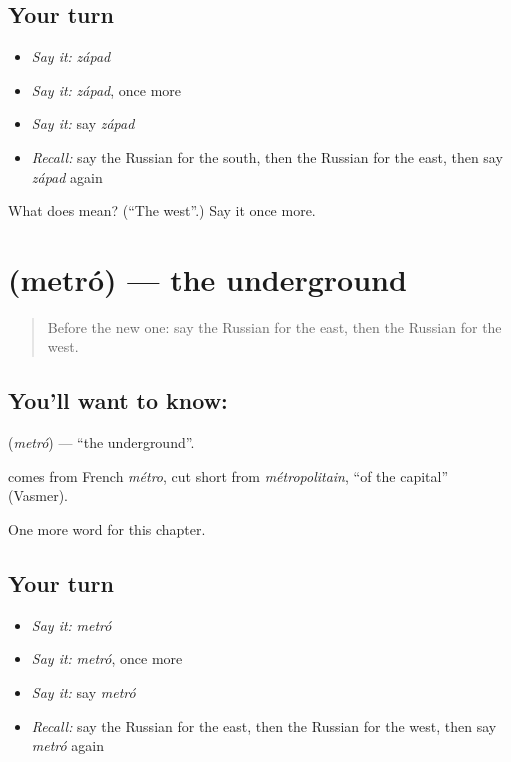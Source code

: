 \subsection*{Your turn}
\begin{itemize}
\raggedright
  \item \emph{Say it:} \emph{západ}
  \item \emph{Say it:} \emph{západ}, once more
  \item \emph{Say it:} say \emph{západ}
  \item \emph{Recall:} say the Russian for the south, then the Russian for the east, then say \emph{západ} again
\end{itemize}

\begin{tcolorbox}[breakable,colback=teal!4,colframe=teal!35!black,title={Before you move on}]
What does  mean? (\textquotedblleft{}The west\textquotedblright{}.) Say it once more.
\end{tcolorbox}
\section[\texorpdfstring{\ru{метро} (metró)}{метро (metró)}]{ (metró) — the underground}

\label{lesson:RU-C91-underground}



\begin{quote}
Before the new one: say the Russian for the east, then the Russian for the west.
\end{quote}

\subsection*{You'll want to know: }
\textbf{} (\emph{metró}) — \textquotedblleft{}the underground\textquotedblright{}.

\begin{cousinweb}
\textbf{} comes from French \emph{métro}, cut short from \emph{métropolitain}, \textquotedblleft{}of the capital\textquotedblright{} (Vasmer).
\end{cousinweb}

\begin{grammarlens}[title={What you've built}]
One more word for this chapter.
\end{grammarlens}

\subsection*{Your turn}
\begin{itemize}
\raggedright
  \item \emph{Say it:} \emph{metró}
  \item \emph{Say it:} \emph{metró}, once more
  \item \emph{Say it:} say \emph{metró}
  \item \emph{Recall:} say the Russian for the east, then the Russian for the west, then say \emph{metró} again
\end{itemize}

